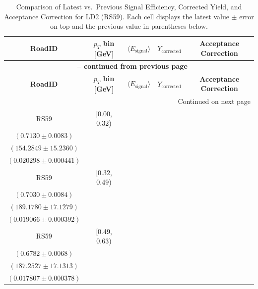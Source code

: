 {\footnotesize
\renewcommand{\arraystretch}{1.35}
\begin{longtable}{|c|c|c|c|c|}
\caption{Comparison of Latest vs.\ Previous Signal Efficiency, Corrected Yield, and Acceptance Correction for LD2 (RS59). Each cell displays the latest value $\pm$ error on top and the previous value in parentheses below.} \label{tab:eff_acc_comp_LD2_RS59} \\
\hline
\textbf{RoadID} & \textbf{$p_{T}$ bin [GeV]} & \textbf{$\langle E_{\mathrm{signal}} \rangle$} & \textbf{$Y_{\mathrm{corrected}}$} & \textbf{Acceptance Correction} \\
\hline
\endfirsthead
\multicolumn{5}{c}{{\bfseries \tablename\ \thetable{} -- continued from previous page}} \\
\hline
\textbf{RoadID} & \textbf{$p_{T}$ bin [GeV]} & \textbf{$\langle E_{\mathrm{signal}} \rangle$} & \textbf{$Y_{\mathrm{corrected}}$} & \textbf{Acceptance Correction} \\
\hline
\endhead
\hline \multicolumn{5}{|r|}{{Continued on next page}} \\ \hline
\endfoot
\hline
\endlastfoot
RS59 & [0.00, 0.32) & \begin{tabular}{@{}c@{}}$0.7491 \pm 0.0056$ \\ $(0.7130 \pm 0.0083)$\end{tabular} & \begin{tabular}{@{}c@{}}$146.8516 \pm 14.5020$ \\ $(154.2849 \pm 15.2360)$\end{tabular} & \begin{tabular}{@{}c@{}}$0.018048 \pm 0.000557$ \\ $(0.020298 \pm 0.000441)$\end{tabular} \\ \hline
RS59 & [0.32, 0.49) & \begin{tabular}{@{}c@{}}$0.7351 \pm 0.0055$ \\ $(0.7030 \pm 0.0084)$\end{tabular} & \begin{tabular}{@{}c@{}}$180.9325 \pm 16.3813$ \\ $(189.1780 \pm 17.1279)$\end{tabular} & \begin{tabular}{@{}c@{}}$0.017115 \pm 0.000492$ \\ $(0.019066 \pm 0.000392)$\end{tabular} \\ \hline
RS59 & [0.49, 0.63) & \begin{tabular}{@{}c@{}}$0.7128 \pm 0.0058$ \\ $(0.6782 \pm 0.0068)$\end{tabular} & \begin{tabular}{@{}c@{}}$178.1819 \pm 16.3015$ \\ $(187.2527 \pm 17.1313)$\end{tabular} & \begin{tabular}{@{}c@{}}$0.016740 \pm 0.000486$ \\ $(0.017807 \pm 0.000378)$\end{tabular} \\ \hline

\end{longtable}}
